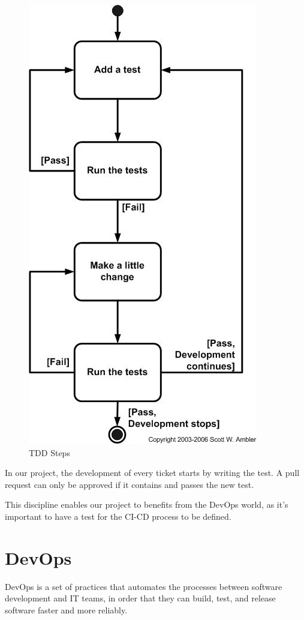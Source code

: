 \begin{spacing}{1.2}
\begin{figure}[H]\centering
\includegraphics[scale=0.6]{tddSteps.jpg}
\caption{TDD Steps}
\label{fig:tdd}
\end{figure}

In our project, the development of every ticket starts by writing the test. A pull request can only be approved if it contains and passes the new test.

This discipline enables our project to benefits from the DevOps world, as it's important to have a test for the CI-CD process to be defined.


\section{DevOps}
DevOps \cite{devops} is a set of practices that automates the processes between software development and IT teams, in order that they can build, test, and release software faster and more reliably.


\end{spacing}
